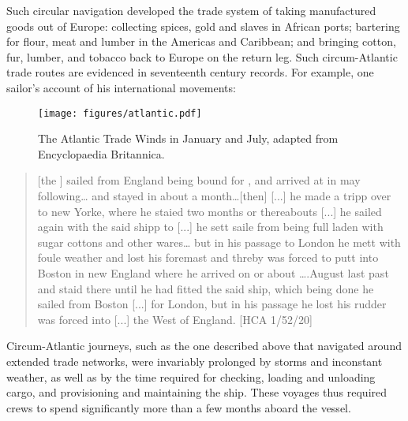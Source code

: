 Such circular navigation developed the trade system of taking manufactured goods out of Europe: collecting spices, gold and slaves in African ports; bartering for flour, meat and lumber in the Americas and Caribbean; and bringing cotton, fur, lumber, and tobacco back to Europe on the return leg. Such circum-Atlantic trade routes are evidenced in  {seventeenth century} records. For example, one  {sailor}’s account of his international movements:


\begin{figure}[t]
\caption{\label{fig:key:4.1} The Atlantic Trade Winds in January and July, adapted from Encyclopaedia Britannica.
%
}
\texttt{[image: figures/atlantic.pdf]}
\end{figure}

\largerpage
\begin{quotation}
[the ] sailed from England being bound for , and arrived at  in may following… and stayed in  about a month…[then] [...] he made a tripp over to new Yorke, where he staied two months or thereabouts [...] he sailed again with the said shipp to  [...] he sett saile from  being full laden with sugar cottons and other wares… but in his passage to London he mett with foule weather and lost his foremast and threby was forced to putt into Boston in new England where he arrived on or about ….August last past and staid there until he had fitted the said ship, which being done he sailed from Boston [...] for London, but in his passage he lost his rudder was forced into [...] the West of England. [HCA 1/52/20]\end{quotation}

Circum-Atlantic journeys, such as the one described above that navigated around extended trade networks, were invariably prolonged by storms and inconstant weather, as well as by the time required for  checking, loading and unloading cargo, and provisioning and maintaining the ship. These voyages thus required crews to spend significantly more than a few months aboard the vessel. 

